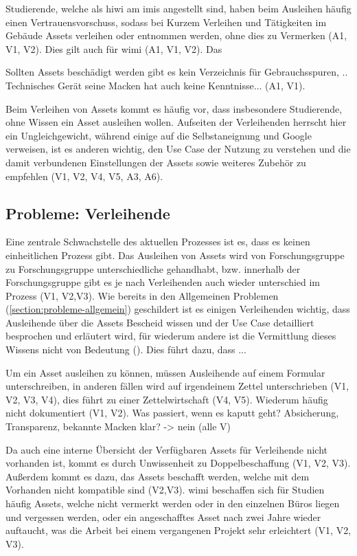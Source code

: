 Studierende, welche als \ac{hiwi} am \ac{imis} angestellt sind, haben beim Ausleihen häufig einen
Vertrauensvorschuss, sodass bei Kurzem Verleihen und Tätigkeiten im Gebäude Assets verleihen oder
entnommen werden, ohne dies zu Vermerken (A1, V1, V2). Dies gilt auch für \ac{wimi} (A1, V1, V2). Das

Sollten Assets beschädigt werden gibt es kein Verzeichnis für Gebrauchsspuren, .. Technisches Gerät
seine Macken hat auch keine Kenntnisse... (A1, V1).

Beim Verleihen von Assets kommt es häufig vor, dass insbesondere Studierende,
ohne Wissen ein Asset ausleihen wollen. Aufseiten der Verleihenden herrscht hier ein
Ungleichgewicht, während einige auf die Selbstaneignung und Google verweisen, ist es anderen
wichtig, den Use Case der Nutzung zu verstehen und die damit verbundenen Einstellungen der Assets
sowie weiteres Zubehör zu empfehlen (V1, V2, V4, V5, A3, A6). 

\subsection*{Probleme: Verleihende}
Eine zentrale Schwachstelle des aktuellen Prozesses ist es, dass es keinen einheitlichen Prozess
gibt. Das Ausleihen von Assets wird von Forschungsgruppe zu Forschungsgruppe unterschiedliche
gehandhabt, bzw. innerhalb der Forschungsgruppe gibt es je nach Verleihenden auch wieder unterschied
im Prozess (V1, V2,V3). Wie bereits in den Allgemeinen Problemen (\ref{section:probleme-allgemein})
geschildert ist es einigen Verleihenden wichtig, dass Ausleihende über die Assets Bescheid wissen
und der Use Case detailliert besprochen und erläutert wird, für wiederum andere ist die Vermittlung
dieses Wissens nicht von Bedeutung (). Dies führt dazu, dass ...  

Um ein Asset ausleihen zu können, müssen Ausleihende auf einem Formular unterschreiben, in anderen
fällen wird auf irgendeinem Zettel unterschrieben (V1, V2, V3, V4), dies führt zu einer
Zettelwirtschaft (V4, V5). Wiederum häufig nicht dokumentiert (V1, V2). Was passiert, wenn es kaputt
geht? Absicherung, Transparenz, bekannte Macken klar? -> nein (alle V)

Da auch eine interne Übersicht der Verfügbaren Assets für Verleihende nicht vorhanden ist, kommt es
durch Unwissenheit zu Doppelbeschaffung (V1, V2, V3). Außerdem kommt es dazu, das Assets beschafft
werden, welche mit dem Vorhanden nicht kompatible sind (V2,V3). \ac*{wimi} beschaffen sich für
Studien häufig Assets, welche nicht vermerkt werden oder in den einzelnen Büros liegen und vergessen
werden, oder ein angeschafftes Asset nach zwei Jahre wieder auftaucht, was die Arbeit bei einem
vergangenen Projekt sehr erleichtert (V1, V2, V3).

